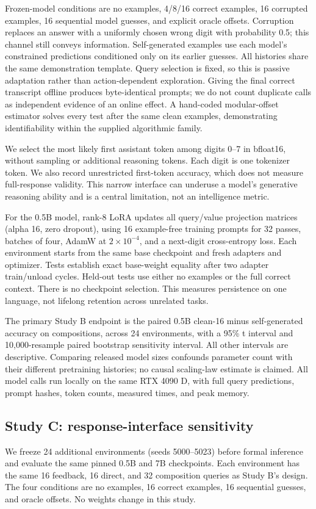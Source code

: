 \documentclass[11pt]{article}
\begin{document}
Frozen-model conditions are no examples, 4/8/16 correct examples, 16 corrupted
examples, 16 sequential model guesses, and explicit oracle offsets. Corruption
replaces an answer with a uniformly chosen wrong digit with probability 0.5;
this channel still conveys information. Self-generated examples use each
model's constrained predictions conditioned only on its earlier guesses.
All histories share the same demonstration template. Query selection is fixed,
so this is passive adaptation rather than action-dependent exploration.
Giving the final correct transcript offline produces byte-identical prompts;
we do not count duplicate calls as independent evidence of an online effect.
A hand-coded modular-offset estimator solves every test after the same clean
examples, demonstrating identifiability within the supplied algorithmic family.

We select the most likely first assistant token among digits 0--7 in bfloat16,
without sampling or additional reasoning tokens. Each digit is one tokenizer
token. We also record unrestricted first-token accuracy, which does not measure
full-response validity. This narrow interface can underuse a model's generative
reasoning ability and is a central limitation, not an intelligence metric.

For the 0.5B model, rank-8 LoRA updates all query/value projection matrices
(alpha 16, zero dropout), using 16 example-free training prompts for 32 passes,
batches of four, AdamW at $2\times10^{-4}$, and a next-digit cross-entropy loss.
Each environment starts from the same base checkpoint and fresh adapters and
optimizer. Tests establish exact base-weight equality after two adapter
train/unload cycles. Held-out tests use either no examples or the full correct
context. There is no checkpoint selection. This measures persistence on one
language, not lifelong retention across unrelated tasks.

The primary Study B endpoint is the paired 0.5B clean-16 minus self-generated
accuracy on compositions, across 24 environments, with a 95\% t interval and
10,000-resample paired bootstrap sensitivity interval. All other intervals
are descriptive. Comparing released model sizes confounds parameter count
with their different pretraining histories; no causal scaling-law estimate is
claimed. All model calls run locally on the same RTX 4090 D, with full query
predictions, prompt hashes, token counts, measured times, and peak memory.

\subsection{Study C: response-interface sensitivity}
We freeze 24 additional environments (seeds 5000--5023) before formal inference
and evaluate the same pinned 0.5B and 7B checkpoints. Each environment has the
same 16 feedback, 16 direct, and 32 composition queries as Study B's design.
The four conditions are no examples, 16 correct examples, 16 sequential guesses,
and oracle offsets. No weights change in this study.
\end{document}
